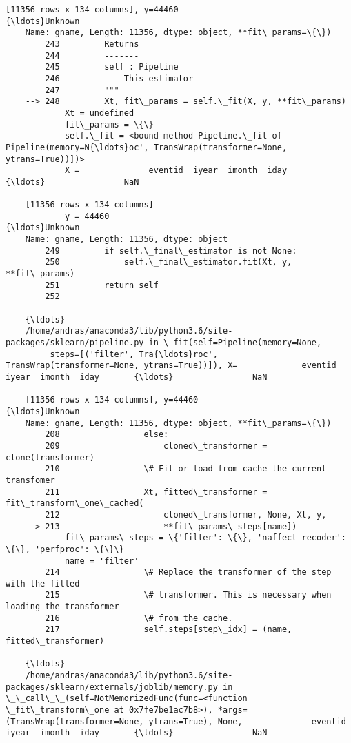 \documentclass[11pt]{article}
\begin{document}
\begin{Verbatim}[commandchars=\\\{\}]
    [11356 rows x 134 columns], y=44460                                           {\ldots}Unknown
    Name: gname, Length: 11356, dtype: object, **fit\_params=\{\})
        243         Returns
        244         -------
        245         self : Pipeline
        246             This estimator
        247         """
    --> 248         Xt, fit\_params = self.\_fit(X, y, **fit\_params)
            Xt = undefined
            fit\_params = \{\}
            self.\_fit = <bound method Pipeline.\_fit of Pipeline(memory=N{\ldots}oc', TransWrap(transformer=None, ytrans=True))])>
            X =              eventid  iyear  imonth  iday       {\ldots}                NaN  
    
    [11356 rows x 134 columns]
            y = 44460                                           {\ldots}Unknown
    Name: gname, Length: 11356, dtype: object
        249         if self.\_final\_estimator is not None:
        250             self.\_final\_estimator.fit(Xt, y, **fit\_params)
        251         return self
        252 
    
    {\ldots}
    /home/andras/anaconda3/lib/python3.6/site-packages/sklearn/pipeline.py in \_fit(self=Pipeline(memory=None,
         steps=[('filter', Tra{\ldots}roc', TransWrap(transformer=None, ytrans=True))]), X=             eventid  iyear  imonth  iday       {\ldots}                NaN  
    
    [11356 rows x 134 columns], y=44460                                           {\ldots}Unknown
    Name: gname, Length: 11356, dtype: object, **fit\_params=\{\})
        208                 else:
        209                     cloned\_transformer = clone(transformer)
        210                 \# Fit or load from cache the current transfomer
        211                 Xt, fitted\_transformer = fit\_transform\_one\_cached(
        212                     cloned\_transformer, None, Xt, y,
    --> 213                     **fit\_params\_steps[name])
            fit\_params\_steps = \{'filter': \{\}, 'naffect recoder': \{\}, 'perfproc': \{\}\}
            name = 'filter'
        214                 \# Replace the transformer of the step with the fitted
        215                 \# transformer. This is necessary when loading the transformer
        216                 \# from the cache.
        217                 self.steps[step\_idx] = (name, fitted\_transformer)
    
    {\ldots}
    /home/andras/anaconda3/lib/python3.6/site-packages/sklearn/externals/joblib/memory.py in \_\_call\_\_(self=NotMemorizedFunc(func=<function \_fit\_transform\_one at 0x7fe7be1ac7b8>), *args=(TransWrap(transformer=None, ytrans=True), None,              eventid  iyear  imonth  iday       {\ldots}                NaN  
    

\end{Verbatim}
\end{document}
